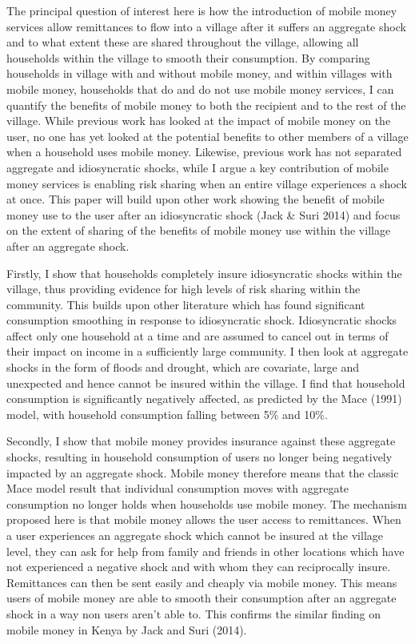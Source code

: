 The principal question of interest here is how the introduction of mobile money services allow remittances to flow into a village after it suffers an aggregate shock and to what extent these are shared throughout the village, allowing all households within the village to smooth their consumption. By comparing households in village with and without mobile money, and within villages with mobile money, households that do and do not use mobile money services, I can quantify the benefits of mobile money to both the recipient and to the rest of the village. While previous work has looked at the impact of mobile money on the user, no one has yet looked at the potential benefits to other members of a village when a household uses mobile money. Likewise, previous work has not separated aggregate and idiosyncratic shocks, while I argue a key contribution of mobile money services is enabling risk sharing when an entire village experiences a shock at once. This paper will build upon other work showing the benefit of mobile money use to the user after an idiosyncratic shock (Jack \& Suri 2014) and focus on the extent of sharing of the benefits of mobile money use within the village after an aggregate shock. 

Firstly, I show that households completely insure idiosyncratic shocks within the village, thus providing evidence for high levels of  risk sharing within the community. This builds upon other literature which has found significant consumption smoothing in response to idiosyncratic shock. Idiosyncratic shocks affect only one household at a time and are assumed to cancel out in terms of their impact on income in a sufficiently large community. I then look at aggregate shocks in the form of floods and drought, which are covariate, large and unexpected and hence cannot be insured within the village. I find that household consumption is significantly negatively affected, as predicted by the Mace (1991) model, with household consumption falling between 5\% and 10\%.  

Secondly, I show that mobile money provides insurance against these aggregate shocks, resulting in household consumption of users no longer being negatively impacted by an aggregate shock. Mobile money therefore means that the classic Mace model result that individual consumption moves with aggregate consumption no longer holds when households use mobile money. The mechanism proposed here is that mobile money allows the user access to remittances. When a user experiences an aggregate shock which cannot be insured at the village level, they can ask for help from family and friends in other locations which have not experienced a negative shock and with whom they can reciprocally insure. Remittances can then be sent easily and cheaply via mobile money. This means users of mobile money are able to smooth their consumption after an aggregate shock in a way non users aren't able to. This confirms the similar finding on mobile money in Kenya by Jack and Suri (2014).   


